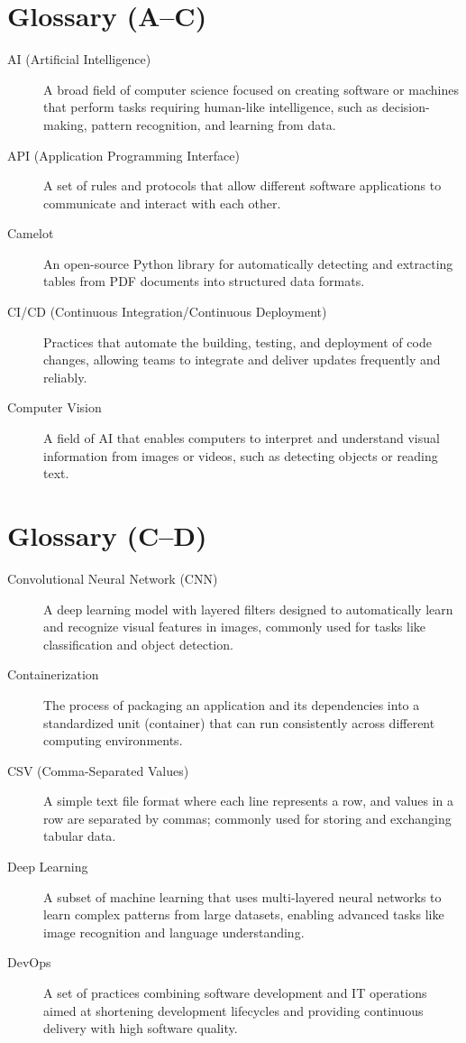 \section*{Glossary (A–C)}
\begin{description}
  \item[AI (Artificial Intelligence)] 
    A broad field of computer science focused on creating software or machines that 
    perform tasks requiring human-like intelligence, such as decision-making, 
    pattern recognition, and learning from data.
  \item[API (Application Programming Interface)] 
    A set of rules and protocols that allow different software applications to 
    communicate and interact with each other.
  \item[Camelot] 
    An open-source Python library for automatically detecting and extracting 
    tables from PDF documents into structured data formats.
  \item[CI/CD (Continuous Integration/Continuous Deployment)] 
    Practices that automate the building, testing, and deployment of code changes, 
    allowing teams to integrate and deliver updates frequently and reliably.
  \item[Computer Vision] 
    A field of AI that enables computers to interpret and understand visual  
    information from images or videos, such as detecting objects or reading text.
\end{description}
\section*{Glossary (C–D)}
\begin{description}
  \item[Convolutional Neural Network (CNN)] 
    A deep learning model with layered filters designed to automatically learn and 
    recognize visual features in images, commonly used for tasks like classification 
    and object detection.
  \item[Containerization] 
    The process of packaging an application and its dependencies into a standardized 
    unit (container) that can run consistently across different computing environments.
  \item[CSV (Comma-Separated Values)] 
    A simple text file format where each line represents a row, and values in a row 
    are separated by commas; commonly used for storing and exchanging tabular data.
  \item[Deep Learning] 
    A subset of machine learning that uses multi-layered neural networks to learn 
    complex patterns from large datasets, enabling advanced tasks like image 
    recognition and language understanding.
  \item[DevOps] 
    A set of practices combining software development and IT operations aimed at 
    shortening development lifecycles and providing continuous delivery with high 
    software quality.
\end{description}
